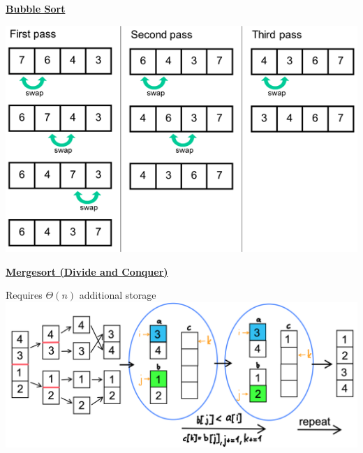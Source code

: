     {\centering\underline{\textbf{Bubble Sort}} \par}
        {\centering \includegraphics*[width = 0.8\linewidth]{src/3_containers/images/bubble_sort.png} \par}
        
        
    {\centering\underline{\textbf{Mergesort (Divide and Conquer)}} \par}
        Requires $\Theta(n)$ additional storage\\
        \includegraphics[width = \linewidth]{src/3_containers/images/mergesort.png}
          

        
    
